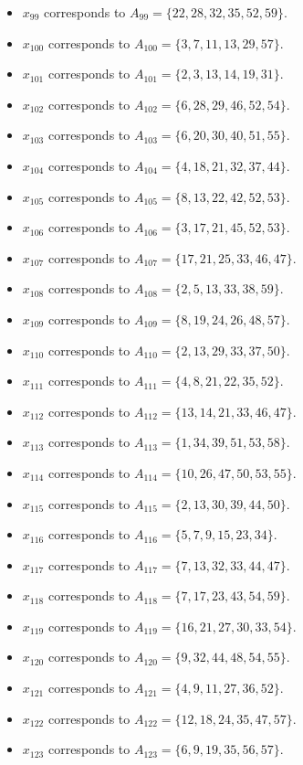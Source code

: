 \documentclass[11pt]{article}
\begin{document}
\begin{itemize}
\item $x_{99}$ corresponds to $A_{99}=\{22, 28, 32, 35, 52, 59\}$.
\item $x_{100}$ corresponds to $A_{100}=\{3, 7, 11, 13, 29, 57\}$.
\item $x_{101}$ corresponds to $A_{101}=\{2, 3, 13, 14, 19, 31\}$.
\item $x_{102}$ corresponds to $A_{102}=\{6, 28, 29, 46, 52, 54\}$.
\item $x_{103}$ corresponds to $A_{103}=\{6, 20, 30, 40, 51, 55\}$.
\item $x_{104}$ corresponds to $A_{104}=\{4, 18, 21, 32, 37, 44\}$.
\item $x_{105}$ corresponds to $A_{105}=\{8, 13, 22, 42, 52, 53\}$.
\item $x_{106}$ corresponds to $A_{106}=\{3, 17, 21, 45, 52, 53\}$.
\item $x_{107}$ corresponds to $A_{107}=\{17, 21, 25, 33, 46, 47\}$.
\item $x_{108}$ corresponds to $A_{108}=\{2, 5, 13, 33, 38, 59\}$.
\item $x_{109}$ corresponds to $A_{109}=\{8, 19, 24, 26, 48, 57\}$.
\item $x_{110}$ corresponds to $A_{110}=\{2, 13, 29, 33, 37, 50\}$.
\item $x_{111}$ corresponds to $A_{111}=\{4, 8, 21, 22, 35, 52\}$.
\item $x_{112}$ corresponds to $A_{112}=\{13, 14, 21, 33, 46, 47\}$.
\item $x_{113}$ corresponds to $A_{113}=\{1, 34, 39, 51, 53, 58\}$.
\item $x_{114}$ corresponds to $A_{114}=\{10, 26, 47, 50, 53, 55\}$.
\item $x_{115}$ corresponds to $A_{115}=\{2, 13, 30, 39, 44, 50\}$.
\item $x_{116}$ corresponds to $A_{116}=\{5, 7, 9, 15, 23, 34\}$.
\item $x_{117}$ corresponds to $A_{117}=\{7, 13, 32, 33, 44, 47\}$.
\item $x_{118}$ corresponds to $A_{118}=\{7, 17, 23, 43, 54, 59\}$.
\item $x_{119}$ corresponds to $A_{119}=\{16, 21, 27, 30, 33, 54\}$.
\item $x_{120}$ corresponds to $A_{120}=\{9, 32, 44, 48, 54, 55\}$.
\item $x_{121}$ corresponds to $A_{121}=\{4, 9, 11, 27, 36, 52\}$.
\item $x_{122}$ corresponds to $A_{122}=\{12, 18, 24, 35, 47, 57\}$.
\item $x_{123}$ corresponds to $A_{123}=\{6, 9, 19, 35, 56, 57\}$.

\end{itemize}
\end{document}
